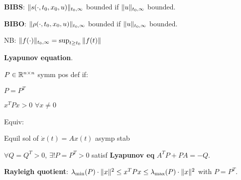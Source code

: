 \begin{Definition}
\textbf{BIBS}: $\|s(\cdot,t_0,x_0,u)\|_{t_0,\infty}$ bounded if $\|u\|_{t_0,\infty}$ bounded.


\textbf{BIBO}: $\|\rho(\cdot,t_0,x_0,u)\|_{t_0,\infty}$ bounded if $\|u\|_{t_0,\infty}$ bounded.

NB: $\|f(\cdot)\|_{t_0,\infty}=\sup_{t\ge t_0}\|f(t)\|_{}$
\end{Definition}

\textbf{Lyapunov equation}.
\begin{Definition}
$P\in\mathbb R^{n\times n}$ symm pos def if:
\begin{itemize*}
  \item $P=P^T$
  \item $x^TPx>0$ $\forall x\ne 0$
\end{itemize*}
\end{Definition}
\begin{Theorem}
Equiv:
\begin{itemize*}
  \item Equil sol of $\dot x(t)=Ax(t)$ asymp stab
  \item $\forall Q=Q^T>0$, $\exists !P=P^T>0$ satisf \textbf{Lyapunov eq} $A^TP+PA=-Q$.
\end{itemize*}
\end{Theorem}
\begin{Definition}
\textbf{Rayleigh quotient}: $\lambda_{\min}(P)\cdot\|x\|_{}^2\le x^TPx\le \lambda_{\max}(P)\cdot\|x\|_{}^2$ with $P=P^T$.
\end{Definition}